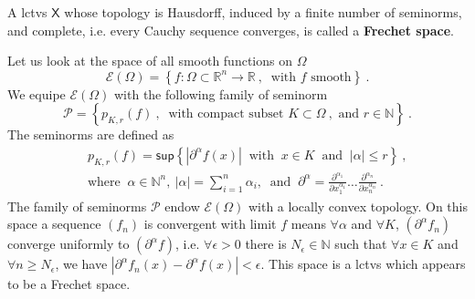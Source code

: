 \documentclass[10pt]{book}
\newcommand{\abs}[1]{\left|#1\right|}
\renewcommand{\sup}{\mathsf{sup}}
\newcommand{\Ecal}{\mathcal{E}}
\newcommand{\Pcal}{\mathcal{P}}
\newcommand{\Nbb}{\mathbb{N}}
\newcommand{\Rbb}{\mathbb{R}}
\newcommand{\Xsf}{\mathsf{X}}
\theoremstyle{break}
\begin{document}
\bigskip


A lctvs $\Xsf$ whose topology is Hausdorff, induced by a finite number of seminorms, and complete, i.e. every Cauchy sequence converges, is called a \textbf{Frechet space}. 


\bigskip


Let us look at the space of all smooth functions on $\Omega$
%
\begin{equation*}
\Ecal(\Omega) =  \left\{ f : \Omega \subset \Rbb^n \to \Rbb \ , \ \mbox{ with } f \mbox{ smooth}  \right\} \ .
\end{equation*}
%
We equipe $\Ecal(\Omega)$ with the following family of seminorm
%
\begin{equation*}
\Pcal = \left\{ p_{K,r}(f) \ , \ \mbox{ with compact subset } K \subset \Omega \ , \mbox{ and } r \in \Nbb \right\} \ . 
\end{equation*}
%
The seminorms are defined as
%
\begin{eqnarray*}
&& p_{K,r}(f) = \sup \left\{ \abs{\partial^\alpha f(x)} \ \mbox{ with } \ x\in K \ \mbox{ and } \ \abs{\alpha} \leq r  \right\} \ , \\
&& \mbox{where } \ \alpha \in \Nbb^n, \ \abs{\alpha} = \sum_{i=1}^n \alpha_i, \ \mbox{ and } \ \partial^\alpha = \frac{\partial^{\alpha_1}}{\partial x_1^{\alpha_1}} \dots \frac{\partial^{\alpha_n}}{\partial x_n^{\alpha_n}} \ .
\end{eqnarray*}
%
The family of seminorms $\Pcal$ endow $\Ecal(\Omega)$ with a locally convex topology.  On this space a sequence $(f_n)$ is convergent with limit $f$ means $\forall \alpha$ and $\forall K$, $(\partial^\alpha f_n)$ converge uniformly to $(\partial^\alpha f)$, i.e. $\forall \epsilon > 0$ there is $N_\epsilon \in \Nbb$ such that $\forall x \in K$ and $\forall n \geq N_\epsilon$, we have $\abs{\partial^\alpha f_n(x) - \partial^\alpha f(x)} < \epsilon$. This space is a lctvs which appears to be a Frechet space.


\bigskip
\end{document}
